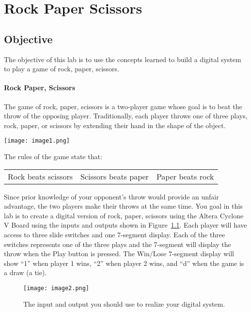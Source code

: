 \chapter{Rock Paper Scissors}
\label{RPS}
\graphicspath{ {./Lab03RockPaperScissor/Fig} }


\hypertarget{objective}{%
\section{Objective }
\label{objective}}

The objective of this lab is to use the concepts learned to build a
digital system to play a game of rock, paper, scissors.

\subsubsection{Rock Paper, Scissors}

The game of rock, paper, scissors is a two-player game whose goal is to
beat the throw of the opposing player. Traditionally, each player throws
one of three plays, rock, paper, or scissors by extending their hand in
the shape of the object.

\texttt{[image:  image1.png]}

The rules of the game state that:

\begin{tabular}{p{4cm}p{4cm}p{4cm}}
Rock beats scissors  & Scissors beats paper & Paper beats rock \\
\end{tabular}

Since prior knowledge of your opponent's throw would provide an unfair
advantage, the two players make their throws at the same time. You goal 
in this lab is to create a digital version of rock, paper,
scissors using the Altera Cyclone V Board using the inputs and outputs
shown in Figure~\ref{figure:systemIO}. Each player will have access to three slide switches
and one 7-segment display. Each of the three switches represents one of
the three plays and the 7-segment will display the throw when the Play
button is pressed. The Win/Lose 7-segment display will show ``1'' when
player 1 wins, ``2'' when player 2 wins, and ``d'' when the game is a
draw (a tie).

\begin{figure}[ht]
\texttt{[image:  image2.png]}
\caption{The input and output you should use to realize your digital system.}
\label{figure:systemIO}
\end{figure}



